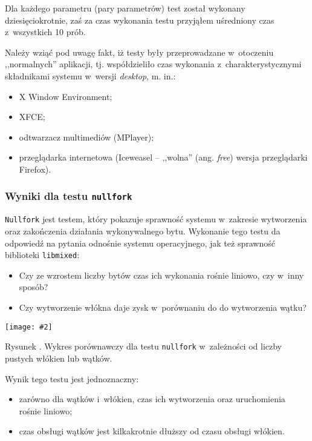 \documentclass[12pt]{mwart}
\newcommand{\code}{\texttt}
\newcounter{figmain}
\newcommand{\myownfigure}[4]{ \newcounter{#1} \setcounter{#1}{\value{figmain}} \addtocounter{figmain}{1} \begin{center} \label{fig:#1} \centering \texttt{[image: \#2]}\\ \nopagebreak[5] \parbox[t]{11.5cm}{Rysunek \arabic{#1}. #3.} \end{center}}
\begin{document}
\par
\indent
  Dla każdego parametru (pary parametrów) test został wykonany dziesięciokrotnie, zaś za czas wykonania testu przyjąłem uśredniony 
  czas z~wszystkich 10 prób.
\par
\indent
  Należy wziąć pod uwagę fakt, iż testy były przeprowadzane w~otoczeniu ,,normalnych'' aplikacji, tj. współdzieliło czas wykonania z~charakterystycznymi składnikami
  systemu w~wersji \emph{desktop}, m. in.:
  \begin{itemize}
    \item X Window Environment;
    \item XFCE;
    \item odtwarzacz multimediów  (MPlayer);
    \item przeglądarka internetowa (Iceweasel -- ,,wolna'' (ang. \emph{free}) wersja przeglądarki Firefox).
  \end{itemize}
\par
\newpage
\subsubsection{Wyniki dla testu \code{nullfork}}
\indent
  \code{Nullfork} jest testem, który pokazuje sprawność systemu w~zakresie wytworzenia oraz zakończenia działania wykonywalnego bytu.
  Wykonanie tego testu da odpowiedź na pytania odnośnie systemu operacyjnego, jak też sprawność biblioteki \code{libmixed}:
  \begin{itemize}
    \item Czy ze wzrostem liczby bytów czas ich wykonania rośnie liniowo, czy w~inny sposób?
    \item Czy wytworzenie włókna daje zysk w~porównaniu do do wytworzenia wątku?
  \end{itemize}
\par
\indent
\myownfigure{nullfork}{nullfork.pdf}{Wykres porównawczy dla testu \code{nullfork} w~zależności od liczby pustych włókien lub wątków}{1.16} 
\par
\begin{comment}
\indent
\myownfigure{nullforkLog}{nullforkLog.png}{Wykres porównawczy dla testu \code{nullfork} -- czas wykonania w~skali logarytmicznej}{.65} 
\par
\end{comment}
\indent
  Wynik tego testu jest jednoznaczny: 
  \begin{itemize}
    \item zarówno dla wątków i~włókien, czas ich wytworzenia oraz uruchomienia rośnie liniowo;
    \item czas obsługi wątków jest kilkakrotnie dłuższy od czasu obsługi włókien.
  \end{itemize}
\par
%
\newpage
\end{document}
